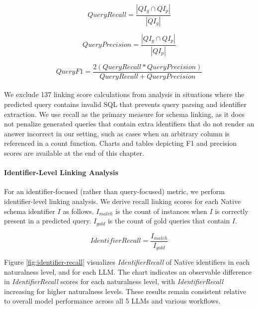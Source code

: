 \begin{equation}
  \label{eq:recall}
  QueryRecall = \frac{|QI_g \cap QI_p|}{|QI_g|}
\end{equation}

\begin{equation}
  \label{eq:precision}
  QueryPrecision = \frac{|QI_g \cap QI_p|}{|QI_p|}
\end{equation}

\begin{equation}
  \label{eq:f1}
  QueryF1 = \frac{2(QueryRecall*QueryPrecision)}{QueryRecall+QueryPrecision}
\end{equation}
\\
We exclude 137 linking score calculations from analysis in situations where the predicted query contains invalid SQL that prevents query parsing and identifier extraction.
We use recall as the primary measure for schema linking, as it does not penalize generated queries that contain extra identifiers that do not render an answer incorrect in our setting, such as cases when an arbitrary column is referenced in a count function.
Charts and tables depicting F1 and precision scores are available at the end of this chapter.

\paragraph{\textbf{Identifier-Level Linking Analysis}}

For an identifier-focused (rather than query-focused) metric, we perform identifier-level linking analysis.
We derive recall linking scores for each Native schema identifier $I$ as follows. 
$I_{match}$ is the count of instances when $I$ is correctly present in a predicted query. 
$I_{gold}$ is the count of gold queries that contain $I$.

\begin{equation}
  \label{eq:identifier-recall}
  IdentifierRecall = \frac{I_{match}}{I_{gold}}
\end{equation}

Figure \ref{fig:identifier-recall} visualizes \emph{IdentifierRecall} of Native identifiers in each naturalness level, and for each LLM.
The chart indicates an observable difference in \emph{IdentifierRecall} scores for each naturalness level, with \emph{IdentifierRecall} increasing for higher naturalness levels.
These results remain consistent relative to overall model performance across all 5 LLMs and various workflows.

